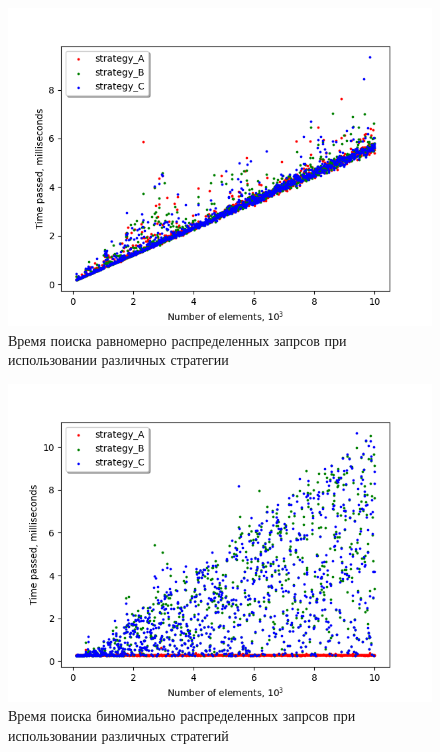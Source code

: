 \documentclass{article}
\begin{document}
\begin{figure}
\includegraphics{uniform.png}
\caption{Время поиска равномерно распределенных запрсов при использовании различных стратегии}
\end{figure}

\begin{figure}
\includegraphics{binomial.png}
\caption{Время поиска биномиально распределенных запрсов при использовании различных стратегий}
\end{figure}
\end{document}
